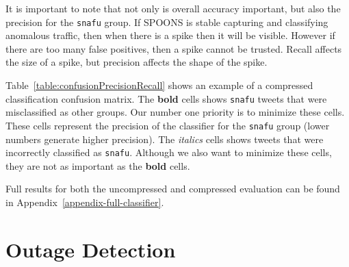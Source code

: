 \documentclass[12pt]{ucthesis}
\begin{document}
It is important to note that not only is overall accuracy important, but also the precision for the \texttt{snafu} group.
If SPOONS is stable capturing and classifying anomalous traffic, then when there is a spike then it will be visible.
However if there are too many false positives, then a spike cannot be trusted. Recall affects the size of a spike, but precision
affects the shape of the spike.

Table~\ref{table:confusionPrecisionRecall} shows an example of a compressed classification confusion matrix.
The \textbf{bold} cells shows \texttt{snafu} tweets that were misclassified as other groups. Our number one priority is to minimize these cells.
These cells represent the precision of the classifier for the \texttt{snafu} group (lower numbers generate higher precision). 
The \emph{italics} cells shows tweets that were incorrectly classified as \texttt{snafu}. Although we also want to minimize these
cells, they are not as important as the \textbf{bold} cells.

\begin{table}[H]
   \begin{center}
      \caption[Misclassified Snafu]{A sample compressed classification confusion matrix showing misclassified \texttt{snafu} tweets.}
      \label{table:confusionPrecisionRecall}
   \end{center}
\end{table}

Full results for both the uncompressed and compressed evaluation can be found in Appendix~\ref{appendix-full-classifier}.



\chapter{Outage Detection}
\label{outage-detection}
\end{document}
